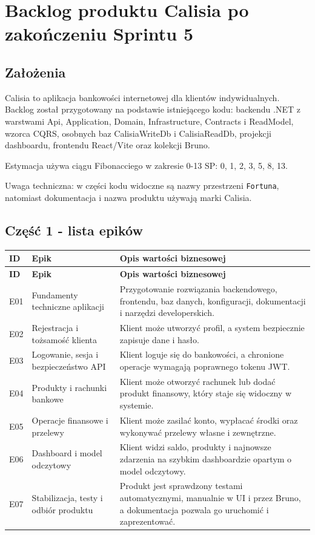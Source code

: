 \documentclass[12pt,a4paper]{article}
\begin{document}
\section*{Backlog produktu Calisia po zakończeniu Sprintu 5}

\subsection*{Założenia}

Calisia to aplikacja bankowości internetowej dla klientów indywidualnych. Backlog został przygotowany na podstawie istniejącego kodu: backendu .NET z warstwami Api, Application, Domain, Infrastructure, Contracts i ReadModel, wzorca CQRS, osobnych baz CalisiaWriteDb i CalisiaReadDb, projekcji dashboardu, frontendu React/Vite oraz kolekcji Bruno.

Estymacja używa ciągu Fibonacciego w zakresie 0-13 SP: 0, 1, 2, 3, 5, 8, 13.

Uwaga techniczna: w części kodu widoczne są nazwy przestrzeni \texttt{Fortuna}, natomiast dokumentacja i nazwa produktu używają marki Calisia.

\subsection*{Część 1 - lista epików}

\begingroup
\footnotesize
{}
\begin{longtable}{@{}L{0.10\textwidth}L{0.27\textwidth}L{0.57\textwidth}@{}}
\toprule
{}
\textbf{ID} & \textbf{Epik} & \textbf{Opis wartości biznesowej} \\
\midrule
\endfirsthead
\toprule
{}
\textbf{ID} & \textbf{Epik} & \textbf{Opis wartości biznesowej} \\
\midrule
\endhead
E01 & Fundamenty techniczne aplikacji & Przygotowanie rozwiązania backendowego, frontendu, baz danych, konfiguracji, dokumentacji i narzędzi developerskich. \\
E02 & Rejestracja i tożsamość klienta & Klient może utworzyć profil, a system bezpiecznie zapisuje dane i hasło. \\
E03 & Logowanie, sesja i bezpieczeństwo API & Klient loguje się do bankowości, a chronione operacje wymagają poprawnego tokenu JWT. \\
E04 & Produkty i rachunki bankowe & Klient może otworzyć rachunek lub dodać produkt finansowy, który staje się widoczny w systemie. \\
E05 & Operacje finansowe i przelewy & Klient może zasilać konto, wypłacać środki oraz wykonywać przelewy własne i zewnętrzne. \\
E06 & Dashboard i model odczytowy & Klient widzi saldo, produkty i najnowsze zdarzenia na szybkim dashboardzie opartym o model odczytowy. \\
E07 & Stabilizacja, testy i odbiór produktu & Produkt jest sprawdzony testami automatycznymi, manualnie w UI i przez Bruno, a dokumentacja pozwala go uruchomić i zaprezentować. \\
\bottomrule
\end{longtable}
\endgroup
\end{document}
